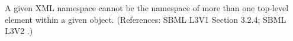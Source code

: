 A given XML namespace cannot be the namespace of more than one top-level
element within a given \Annotation object.  (References: SBML L3V1 Section 3.2.4; SBML L3V2
.)

